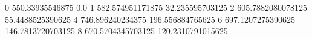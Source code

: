0 550.33935546875 0.0
1 582.574951171875 32.235595703125
2 605.7882080078125 55.4488525390625
4 746.896240234375 196.556884765625
6 697.1207275390625 146.7813720703125
8 670.5704345703125 120.2310791015625
